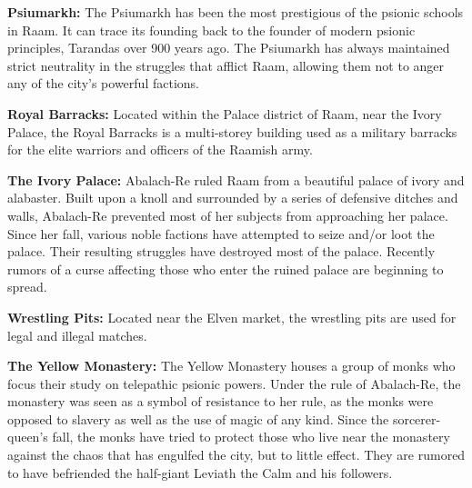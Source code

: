 {	\textbf{Psiumarkh:} The Psiumarkh has been the most prestigious of the psionic schools in Raam. It can trace its founding back to the founder of modern psionic principles, Tarandas over 900 years ago. The Psiumarkh has always maintained strict neutrality in the struggles that afflict Raam, allowing them not to anger any of the city's powerful factions.

	\textbf{Royal Barracks:} Located within the Palace district of Raam, near the Ivory Palace, the Royal Barracks is a multi-storey building used as a military barracks for the elite warriors and officers of the Raamish army.

	\textbf{The Ivory Palace:} Abalach-Re ruled Raam from a beautiful palace of ivory and alabaster. Built upon a knoll and surrounded by a series of defensive ditches and walls, Abalach-Re prevented most of her subjects from approaching her palace. Since her fall, various noble factions have attempted to seize and/or loot the palace. Their resulting struggles have destroyed most of the palace. Recently rumors of a curse affecting those who enter the ruined palace are beginning to spread.

	\textbf{Wrestling Pits:} Located near the Elven market, the wrestling pits are used for legal and illegal matches.

	\textbf{The Yellow Monastery:} The Yellow Monastery houses a group of monks who focus their study on telepathic psionic powers. Under the rule of Abalach-Re, the monastery was seen as a symbol of resistance to her rule, as the monks were opposed to slavery as well as the use of magic of any kind. Since the sorcerer-queen's fall, the monks have tried to protect those who live near the monastery against the chaos that has engulfed the city, but to little effect. They are rumored to have befriended the half-giant Leviath the Calm and his followers.
}
